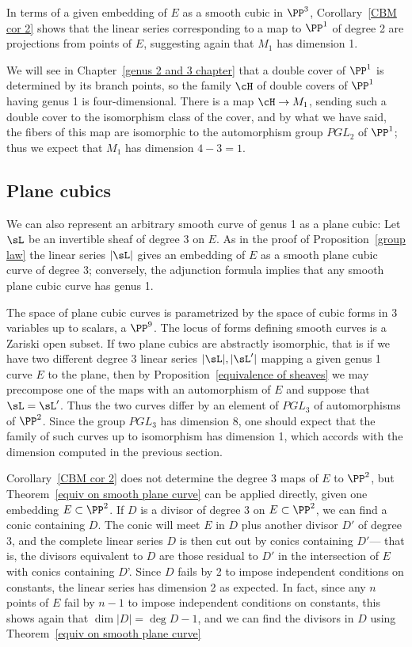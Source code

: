 In terms of a given embedding of $E$ as a smooth cubic in $\PP^{3}$, Corollary~\ref{CBM cor 2}
shows that the linear series corresponding to a map to $\PP^{1}$ of degree 2 are 
projections from points of $E$, suggesting again that $M_{1}$ has dimension 1.

We will see in Chapter~\ref{genus 2 and 3 chapter} that a double cover of $\PP^1$ is determined by  its branch points, so the family $\cH$ of double covers of $\PP^1$ having genus 1 is four-dimensional. There is a map $\cH \to M_1$, sending such a double cover to the isomorphism class of the cover, and by what we have said, the fibers of this map are isomorphic to the automorphism group $PGL_2$ of $\PP^1$; thus we expect that $M_1$ has dimension $4-3=1$.

\subsection{Plane cubics}

We can also represent an arbitrary smooth curve of genus 1 as a plane cubic:
Let $\sL$ be an invertible sheaf of degree 3 on $E$. As in the proof of Proposition~\ref{group law} the linear series $|\sL|$ gives an embedding of $E$ as a smooth plane cubic curve of degree 3; conversely, the adjunction formula implies that any smooth plane cubic curve has genus 1. 

The space of plane cubic curves is parametrized by the space of cubic forms in 3 variables up to 
scalars, a  $\PP^9$. The locus of forms defining smooth curves is a Zariski open subset. If two plane cubics are abstractly
isomorphic, that is if we have two different degree 3 linear series $|\sL|, |\sL'|$ mapping a given genus 1 curve $E$ to the plane, then by
Proposition~\ref{equivalence of sheaves} we may  precompose one of the maps with an automorphism of $E$
and suppose that $\sL = \sL'$. Thus the two curves differ by an element of $PGL_3$ of automorphisms of $\PP^2$. Since the group $PGL_3$ has dimension 8, one should expect that the family of such curves up to isomorphism has dimension 1, which accords with the dimension computed in the previous section.

Corollary~\ref{CBM cor 2} does not determine the degree 3 maps of $E$ to $\PP^{2}$, but Theorem~\ref{equiv on smooth plane curve} can be applied directly, given one embedding $E\subset \PP^2$. If $D$ is a divisor of degree 3 on $E\subset \PP^2$, we can
find a conic containing $D$. The conic will meet $E$ in $D$ plus another divisor $D'$ of degree 3, and the complete linear series
$D$ is then cut out by conics containing $D'$--- that is, the divisors equivalent to $D$ are those residual to $D'$ in the intersection
of $E$ with conics containing $D$'. Since $D$ fails by 2 to impose independent conditions on constants, the linear series has dimension 2 as expected. In fact, since any $n$ points of $E$ fail by $n-1$ to impose independent conditions on constants, this shows again
that $\dim |D| = \deg D -1$, and we can find the divisors in $D$ using Theorem~\ref{equiv on smooth plane curve}


